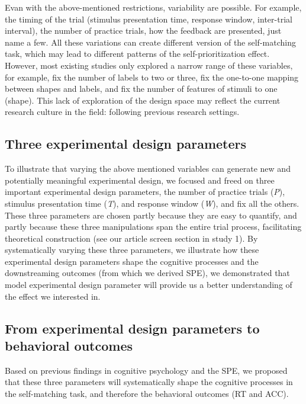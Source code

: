 \documentclass[
  english,
  man,floatsintext]{apa6}
\begin{document}
Evan with the above-mentioned restrictions, variability are possible. For example, the timing of the trial (stimulus presentation time, response window, inter-trial interval), the number of practice trials, how the feedback are presented, just name a few. All these variations can create different version of the self-matching task, which may lead to different patterns of the self-prioritization effect. However, most existing studies only explored a narrow range of these variables, for example, fix the number of labels to two or three, fix the one-to-one mapping between shapes and labels, and fix the number of features of stimuli to one (shape). This lack of exploration of the design space may reflect the current research culture in the field: following previous research settings.

\subsection{Three experimental design parameters}\label{three-experimental-design-parameters}

To illustrate that varying the above mentioned variables can generate new and potentially meaningful experimental design, we focused and freed on three important experimental design parameters, the number of practice trials (\emph{P}), stimulus presentation time (\emph{T}), and response window (\emph{W}), and fix all the others. These three parameters are chosen partly because they are easy to quantify, and partly because these three manipulations span the entire trial process, facilitating theoretical construction (see our article screen section in study 1). By systematically varying these three parameters, we illustrate how these experimental design parameters shape the cognitive processes and the downstreaming outcomes (from which we derived SPE), we demonstrated that model experimental design parameter will provide us a better understanding of the effect we interested in.

\subsection{From experimental design parameters to behavioral outcomes}\label{from-experimental-design-parameters-to-behavioral-outcomes}

Based on previous findings in cognitive psychology and the SPE, we proposed that these three parameters will systematically shape the cognitive processes in the self-matching task, and therefore the behavioral outcomes (RT and ACC).
\end{document}
